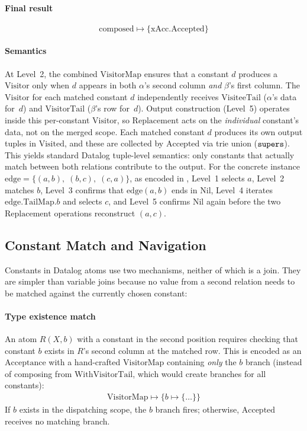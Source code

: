 \paragraph{Final result}
\[
  \mathrm{composed} \mapsto \{\mathrm{xAcc}.\mathrm{Accepted}\}
\]

\paragraph{Semantics}
At Level~2, the combined $\mathrm{VisitorMap}$ ensures that a
constant $d$ produces a $\mathrm{Visitor}$ only when $d$
appears in both $\alpha$'s second column \emph{and}
$\beta$'s first column.
The $\mathrm{Visitor}$ for each matched constant $d$
independently receives $\mathrm{VisiteeTail}$ ($\alpha$'s
data for~$d$) and $\mathrm{VisitorTail}$ ($\beta$'s row
for~$d$).
Output construction (Level~5) operates inside this
per-constant $\mathrm{Visitor}$, so $\mathrm{Replacement}$
acts on the \emph{individual} constant's data, not on the
merged scope.
Each matched constant $d$ produces its own output tuples
in $\mathrm{Visited}$, and these are collected by
$\mathrm{Accepted}$ via trie union ($\mathtt{supers}$).
This yields standard Datalog tuple-level semantics: only
constants that actually match between both relations
contribute to the output.
For the concrete instance
$\mathrm{edge} = \{(a,b),\; (b,c),\; (c,a)\}$, as encoded in
,
Level~1 selects $a$, Level~2 matches $b$, Level~3 confirms
that $\mathrm{edge}(a,b)$ ends in $\mathrm{Nil}$, Level~4
iterates $\mathrm{edge}.\mathrm{TailMap}.b$ and selects $c$,
and Level~5 confirms $\mathrm{Nil}$ again before the two
$\mathrm{Replacement}$ operations reconstruct $(a,c)$.

\subsection{Constant Match and Navigation}
\label{sec:encoding-constants}

Constants in Datalog atoms use two mechanisms, neither of
which is a join.
They are simpler than variable joins because no value from a
second relation needs to be matched against the currently chosen
constant:

\paragraph{Type existence match}
An atom $R(X, b)$ with a constant in the second position
requires checking that constant $b$ exists in $R$'s
second column at the matched row.
This is encoded as an $\mathrm{Acceptance}$ with a
hand-crafted $\mathrm{VisitorMap}$ containing \emph{only}
the $b$ branch (instead of composing from
  $\mathrm{WithVisitorTail}$, which would create branches for
all constants):
{\small
  \begin{align*}
    \mathrm{VisitorMap} \mapsto \{b \mapsto \{\ldots\}\}
\end{align*}}
If $b$ exists in the dispatching scope, the
$b$ branch fires; otherwise, $\mathrm{Accepted}$
receives no matching branch.

